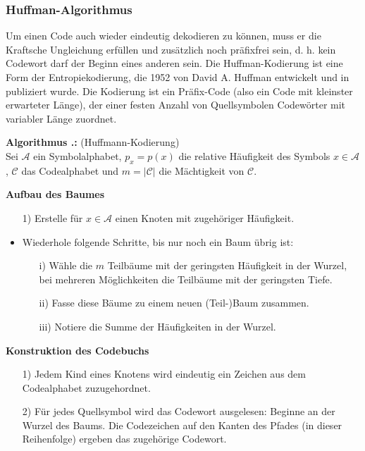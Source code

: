 \documentclass[a4paper,12pt]{article}
\newcommand{\A}{\mathcal A}
\newcommand{\C}{\mathcal C}
\newcounter{Algorithmus}
\newenvironment{Algorithmus}{
\medskip
        
        \setlength{\parindent}{0pt}
        \addtocounter{Algorithmus}{1}
        \textbf{\textsf{Algorithmus \thesubsection.\theAlgorithmus}:}}{
        \nopagebreak
        \vspace{-1.0ex}
        \bigskip
        
}
\begin{document}
\subsubsection{Huffman-Algorithmus}
Um einen Code auch wieder eindeutig dekodieren zu können, muss er die Kraftsche Ungleichung erfüllen und zusätzlich noch präfixfrei sein, d. h. kein Codewort darf der Beginn eines anderen sein.
Die Huffman-Kodierung ist eine Form der Entropiekodierung, die 1952 von David A. Huffman entwickelt und in \cite{Huffman} publiziert wurde.
Die Kodierung ist ein Präfix-Code (also ein Code mit kleinster erwarteter Länge), der einer festen Anzahl von Quellsymbolen Codewörter mit variabler Länge zuordnet.
\begin{Algorithmus} (Huffmann-Kodierung)
\\
 Sei $\A$ ein Symbolalphabet, $p_{x}=p(x)$ die relative Häufigkeit des Symbols $x \in \A$, $\C$ das Codealphabet und $m=| \C |$ die Mächtigkeit von $\C$.
\par
\textbf{Aufbau des Baumes}
\begin{itemize}
	\item[1)] Erstelle für $x \in \A$ einen Knoten mit zugehöriger Häufigkeit.
	\item Wiederhole folgende Schritte, bis nur noch ein Baum übrig ist:
	\begin{itemize}
		\item[i)] Wähle die $m$ Teilbäume mit der geringsten Häufigkeit in der Wurzel, bei mehreren Möglichkeiten die Teilbäume mit der geringsten Tiefe.
		\item[ii)]  Fasse diese Bäume zu einem neuen (Teil-)Baum zusammen.
		\item[iii)]  Notiere die Summe der Häufigkeiten in der Wurzel.
	\end{itemize} 
\end{itemize}
\newpage
\textbf{Konstruktion des Codebuchs}
\begin{itemize}
	\item[1)]  Jedem Kind eines Knotens wird eindeutig ein Zeichen aus dem Codealphabet zuzugehordnet.
	\item[2)]  Für jedes Quellsymbol wird das Codewort ausgelesen: Beginne an der Wurzel des Baums. Die Codezeichen auf den Kanten des Pfades (in dieser Reihenfolge) ergeben das zugehörige Codewort.
\end{itemize}   
\end{Algorithmus}
\end{document}
